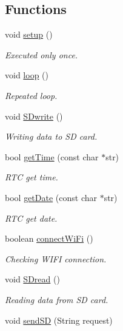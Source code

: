 \subsection*{Functions}
\begin{DoxyCompactItemize}
\item 
void \hyperlink{_w_s_8ino_a4fc01d736fe50cf5b977f755b675f11d}{setup} ()
\begin{DoxyCompactList}\small\item\em Executed only once. \end{DoxyCompactList}\item 
void \hyperlink{_w_s_8ino_afe461d27b9c48d5921c00d521181f12f}{loop} ()
\begin{DoxyCompactList}\small\item\em Repeated loop. \end{DoxyCompactList}\item 
void \hyperlink{_w_s_8ino_a5abc7cb0136096487b90a0a7001f1da6}{S\+Dwrite} ()
\begin{DoxyCompactList}\small\item\em Writing data to SD card. \end{DoxyCompactList}\item 
bool \hyperlink{_w_s_8ino_ae96ca3df2e8b9eef75d400de6ef06db3}{get\+Time} (const char $\ast$str)
\begin{DoxyCompactList}\small\item\em R\+TC get time. \end{DoxyCompactList}\item 
bool \hyperlink{_w_s_8ino_a100af87d91fcaa6f23f2ca6a2fe146cc}{get\+Date} (const char $\ast$str)
\begin{DoxyCompactList}\small\item\em R\+TC get date. \end{DoxyCompactList}\item 
boolean \hyperlink{_w_s_8ino_a144025702d7aa7708d704324ecb09eff}{connect\+Wi\+Fi} ()
\begin{DoxyCompactList}\small\item\em Checking W\+I\+FI connection. \end{DoxyCompactList}\item 
void \hyperlink{_w_s_8ino_ae25c95c757003a1f2daacee7dae07105}{S\+Dread} ()
\begin{DoxyCompactList}\small\item\em Reading data from SD card. \end{DoxyCompactList}\item 
void \hyperlink{_w_s_8ino_acca4eb89d9cb2ffb1d5d9fa19d429f9c}{send\+SD} (String request)

\end{DoxyCompactItemize}
